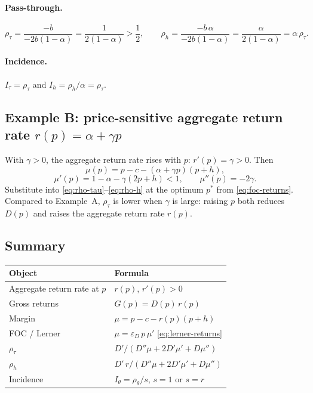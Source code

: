 \documentclass[11pt]{article}
\begin{document}
\paragraph{Pass-through.}
\[
  \rho_\tau = \frac{-b}{-2b(1-\alpha)} = \frac{1}{2(1-\alpha)} > \frac{1}{2},
  \qquad
  \rho_h = \frac{-b\,\alpha}{-2b(1-\alpha)} = \frac{\alpha}{2(1-\alpha)}
  = \alpha\,\rho_\tau.
\]

\paragraph{Incidence.}
$I_\tau = \rho_\tau$ and $I_h = \rho_h/\alpha = \rho_\tau$.

\subsection{Example B: price-sensitive aggregate return rate $r(p)=\alpha+\gamma p$}

With $\gamma>0$, the aggregate return rate rises with $p$: $r'(p)=\gamma>0$.
Then
\[
  \mu(p) = p - c - (\alpha+\gamma p)(p+h),
\]
\[
  \mu'(p) = 1 - \alpha - \gamma(2p+h) < 1,
  \qquad
  \mu''(p) = -2\gamma.
\]
Substitute into \eqref{eq:rho-tau}--\eqref{eq:rho-h} at the optimum $p^*$
from \eqref{eq:foc-returns}.  Compared to Example~A, $\rho_\tau$ is lower
when $\gamma$ is large: raising $p$ both reduces $D(p)$ and raises the
aggregate return rate $r(p)$.

\subsection{Summary}

\begin{center}
\begin{tabular}{ll}
  \hline
  Object & Formula \\
  \hline
  Aggregate return rate at $p$ & $r(p)$, $r'(p)>0$ \\
  Gross returns & $G(p) = D(p)\,r(p)$ \\
  Margin & $\mu = p - c - r(p)(p+h)$ \\
  FOC / Lerner & $\mu = \varepsilon_D\, p\,\mu'$
    \eqref{eq:lerner-returns} \\
  $\rho_\tau$ & $D'/(D''\mu + 2D'\mu' + D\mu'')$ \\
  $\rho_h$ & $D'\,r/(D''\mu + 2D'\mu' + D\mu'')$ \\
  Incidence & $I_\theta = \rho_\theta/s$, $s=1$ or $s=r$ \\
  \hline
\end{tabular}
\end{center}
\end{document}
